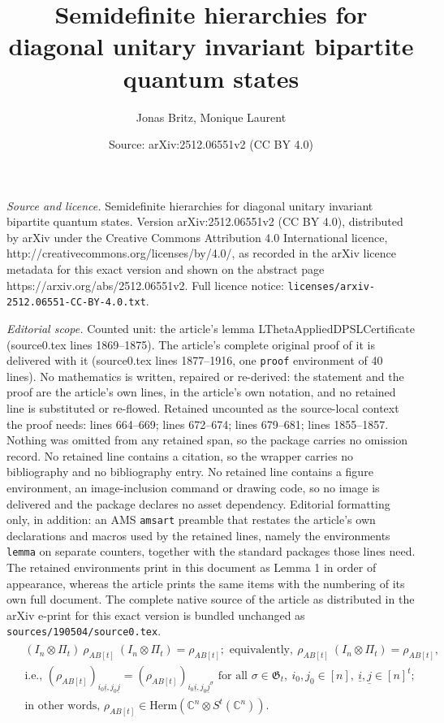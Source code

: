 \documentclass[10pt,a4paper]{amsart}
\title{Semidefinite hierarchies for diagonal unitary invariant bipartite quantum states}
\author{Jonas Britz, Monique Laurent}
\date{Source: arXiv:2512.06551v2 (CC BY 4.0)}
\newcommand{\C}{\ensuremath{\mathbb{C}}} %
\newcommand{\Herm}{\mathrm{Herm}}
\newcommand{\Perm}{\mathfrak G}
\newcommand{\ot}{\otimes}
\newcommand{\ui}{\underline{i}}
\newcommand{\uj}{\underline{j}}
\begin{document}
\maketitle

\noindent\emph{Source and licence.} Semidefinite hierarchies for diagonal unitary invariant bipartite quantum states. Version arXiv:2512.06551v2 (CC BY 4.0), distributed by arXiv under the Creative Commons Attribution 4.0 International licence, http://creativecommons.org/licenses/by/4.0/, as recorded in the arXiv licence metadata for this exact version and shown on the abstract page https://arxiv.org/abs/2512.06551v2. Full licence notice: \texttt{licenses/arxiv-2512.06551-CC-BY-4.0.txt}.\par\smallskip

\noindent\textit{Editorial scope.} Counted unit: the article's lemma LThetaAppliedDPSLCertificate (source0.tex lines 1869--1875). The article's complete original proof of it is delivered with it (source0.tex lines 1877--1916, one \texttt{proof} environment of 40 lines). No mathematics is written, repaired or re-derived: the statement and the proof are the article's own lines, in the article's own notation, and no retained line is substituted or re-flowed.  Retained uncounted as the source-local context the proof needs: lines 664--669; lines 672--674; lines 679--681; lines 1855--1857.  Nothing was omitted from any retained span, so the package carries no omission record.  No retained line contains a citation, so the wrapper carries no bibliography and no bibliography entry.  No retained line contains a figure environment, an image-inclusion command or drawing code, so no image is delivered and the package declares no asset dependency.  Editorial formatting only, in addition: an AMS \texttt{amsart} preamble that restates the article's own declarations and macros used by the retained lines, namely the environments \texttt{lemma} on separate counters, together with the standard packages those lines need.  The retained environments print in this document as Lemma 1 in order of appearance, whereas the article prints the same items with the numbering of its own full document.  The complete native source of the article as distributed in the arXiv e-print for this exact version is bundled unchanged as \texttt{sources/190504/source0.tex}.
\begin{align}\label{eq:DPS1}
\begin{split}
& (I_n\ot \Pi_t) \ \rho_{AB[t]} \ (I_n\ot \Pi_t) = \rho_{AB[t]}; \text{  equivalently}, \  \rho_{AB[t]} \ (I_n\ot \Pi_t) = \rho_{AB[t]}, \\
&\text{i.e., } (\rho_{AB[t]})_{i_0\ui,j_0\uj}= (\rho_{AB[t]})_{i_0 \ui,j_0\uj^\sigma} \text{ for all } \sigma \in \Perm_t,\ i_0,j_0\in [n],\ \ui,\uj\in [n]^t;\\
& \text{in other words, } \rho_{AB[t]}\in \Herm(\C^n\ot S^t(\C^n)).
\end{split}\end{align}
\end{document}
